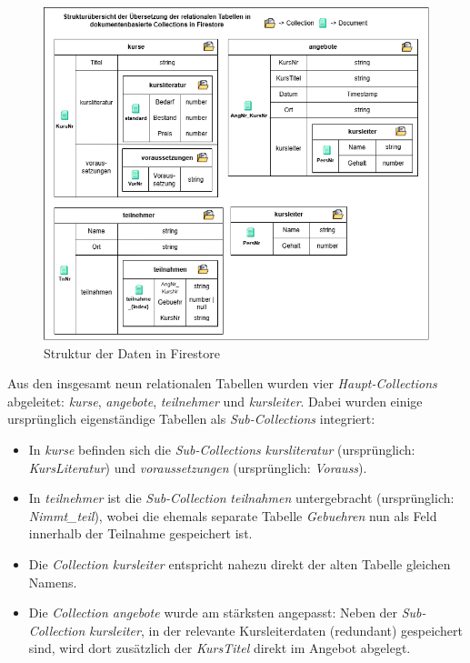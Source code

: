 \documentclass[12pt,a4paper%
              ,oneside     %
              ,titlepage
              ,DIV=13
              ,headinclude
              ,footinclude=false%
              ,cleardoublepage=empty%
              ,parskip=half,
              BCOR=0mm,
              ]{scrreprt}
\begin{document}
\begin{figure}[H]
	\centering
	\includegraphics[width=\dimexpr0.9\linewidth]{img/StrukturFirestore.png}
	\caption{Struktur der Daten in Firestore}
	\label{fig:structure}
\end{figure}

Aus den insgesamt neun relationalen Tabellen wurden vier \textit{Haupt-Collections} abgeleitet: \textit{kurse}, \textit{angebote}, \textit{teilnehmer} und \textit{kursleiter}. Dabei wurden einige ursprünglich eigenständige Tabellen als \textit{Sub-Collections} integriert:

\begin{itemize}
	\item In \textit{kurse} befinden sich die \textit{Sub-Collections} \textit{kursliteratur} (ursprünglich: \textit{KursLiteratur}) und \textit{voraussetzungen} (ursprünglich: \textit{Vorauss}).
	\item In \textit{teilnehmer} ist die \textit{Sub-Collection} \textit{teilnahmen} untergebracht (ursprünglich: \textit{Nimmt\_teil}), wobei die ehemals separate Tabelle \textit{Gebuehren} nun als Feld innerhalb der Teilnahme gespeichert ist.
	\item Die \textit{Collection kursleiter} entspricht nahezu direkt der alten Tabelle gleichen Namens.
	\item Die \textit{Collection angebote} wurde am stärksten angepasst: Neben der \textit{Sub-Collection} \textit{kursleiter}, in der relevante Kursleiterdaten (redundant) gespeichert sind, wird dort zusätzlich der \textit{KursTitel} direkt im Angebot abgelegt.
\end{itemize}
\end{document}
